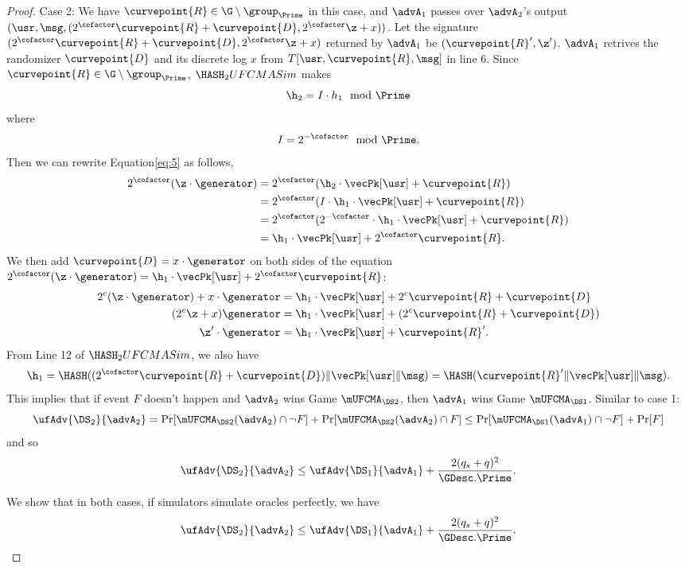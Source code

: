 \begin{proof}
		Case 2: We have $\curvepoint{R} \in \G \setminus \group_{\Prime}$ in this case, and $\advA_1$ passes over $\advA_2$'s output $(\usr, \msg, (2^\cofactor\curvepoint{R} + \curvepoint{D}, 2^\cofactor\z + x))$. Let the signature $(2^\cofactor\curvepoint{R} + \curvepoint{D}, 2^\cofactor\z + x)$ returned by $\advA_1$ be $(\curvepoint{R}', \z')$. $\advA_1$ retrives the randomizer $\curvepoint{D}$ and its discrete log $x$ from $T[\usr, \curvepoint{R},  \msg]$ in line 6. Since $\curvepoint{R} \in \G \setminus \group_{\Prime}$, $\HASH_2UFCMASim$ makes 
		\[\h_2 =  I \cdot h_1 \mod \Prime\]
		where 
		\[I = 2^{-\cofactor} \mod \Prime.\]
		Then we can rewrite Equation\eqref{eq:5}  as follows,
		\begin{align*} 
			2^\cofactor(\z \cdot  \generator) &= 2^\cofactor (\h_2 \cdot \vecPk[\usr] + \curvepoint{R}) \\
			&=  2^\cofactor (I \cdot \h_1 \cdot \vecPk[\usr] + \curvepoint{R})\\
			&= 2^\cofactor (2^{-\cofactor} \cdot \h_1 \cdot \vecPk[\usr] + \curvepoint{R})\\
			&=  \h_1 \cdot \vecPk[\usr] + 2^\cofactor \curvepoint{R}.
		\end{align*}
		We then add $\curvepoint{D} = x \cdot \generator$ on both sides of the equation $2^\cofactor(\z \cdot  \generator) =  \h_1 \cdot \vecPk[\usr] + 2^\cofactor \curvepoint{R}$:
		\begin{align*} 
			2^c(\z \cdot  \generator) +  x \cdot \generator &=  \h_1 \cdot \vecPk[\usr] + 2^c \curvepoint{R} + \curvepoint{D}\\
			(2^c \z + x)\generator &=  \h_1 \cdot \vecPk[\usr] + (2^c \curvepoint{R} + \curvepoint{D})\\
			\z' \cdot  \generator &= \h_1 \cdot \vecPk[\usr] + \curvepoint{R}'.
		\end{align*}
		From Line 12 of $\HASH_2UFCMASim$, we also have
		\[\h_1 = \HASH((2^\cofactor\curvepoint{R} + \curvepoint{D}) \|\vecPk[\usr]\| \msg) = \HASH(\curvepoint{R}'\|\vecPk[\usr]\| \msg).\]
		This implies that if event $F$ doesn't happen and $\advA_2$ wins Game $\mUFCMA_{\DS2}$, then $\advA_1$ wins Game $\mUFCMA_{\DS1}$. Similar to case 1:
		\[\ufAdv{\DS_2}{\advA_2} = \Pr[\mUFCMA_{\DS2}(\advA_2) \cap \neg F] +  \Pr[\mUFCMA_{\DS2}(\advA_2) \cap F] \leq \Pr[\mUFCMA_{\DS1}(\advA_1) \cap \neg F] + \Pr[F]\] 
		and so
		\[\ufAdv{\DS_2}{\advA_2} \leq \ufAdv{\DS_1}{\advA_1} +  \frac{2(q_s + q)^2}{\GDesc.\Prime}.\]
		
		We show that in both cases, if simulators simulate oracles perfectly, we have
		\[\ufAdv{\DS_2}{\advA_2} \leq \ufAdv{\DS_1}{\advA_1} +  \frac{2(q_s + q)^2}{\GDesc.\Prime}.\]
		

\end{proof}
